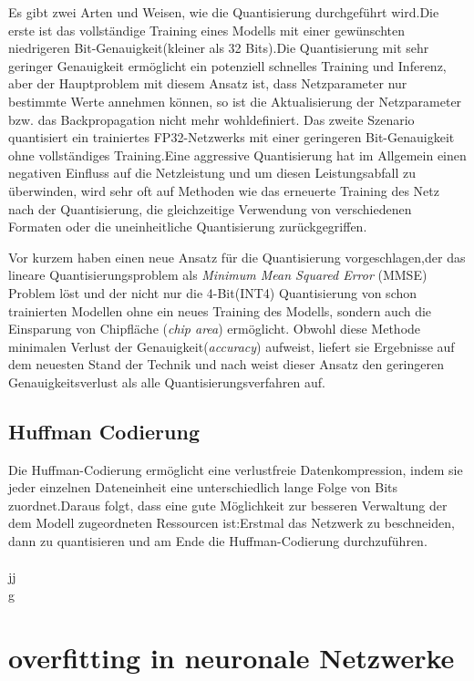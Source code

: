 \documentclass[12pt,a4paper]{scrartcl}
\numberwithin{equation}{section}
\begin{document}
Es gibt zwei Arten und Weisen, wie die Quantisierung durchgeführt wird.Die erste ist das vollständige Training eines Modells mit einer gewünschten niedrigeren Bit-Genauigkeit(kleiner als 32 Bits).Die Quantisierung mit sehr geringer Genauigkeit ermöglicht ein potenziell schnelles Training und Inferenz, aber der Hauptproblem mit diesem Ansatz ist, dass Netzparameter nur bestimmte Werte annehmen können, so ist die Aktualisierung der Netzparameter bzw. das Backpropagation nicht mehr wohldefiniert.
Das zweite Szenario  quantisiert ein trainiertes FP32-Netzwerks mit einer geringeren Bit-Genauigkeit ohne vollständiges Training.Eine aggressive Quantisierung hat im Allgemein einen negativen Einfluss auf die Netzleistung und um diesen Leistungsabfall zu überwinden, wird sehr oft auf Methoden wie das erneuerte Training des Netz nach der Quantisierung, die gleichzeitige Verwendung von verschiedenen Formaten oder die uneinheitliche Quantisierung zurückgegriffen.

Vor kurzem haben \cite[Yoni et al]{quantizationYoni} einen neue Ansatz für die Quantisierung vorgeschlagen,der das lineare Quantisierungsproblem als \textit{Minimum Mean Squared Error} (MMSE) Problem löst und der nicht nur die 4-Bit(INT4) Quantisierung von schon trainierten Modellen ohne ein neues Training des Modells, sondern auch die Einsparung von Chipfläche (\textit{chip area}) ermöglicht. Obwohl diese Methode  minimalen Verlust der Genauigkeit(\textit{accuracy}) aufweist, liefert sie Ergebnisse auf dem neuesten Stand der Technik und nach \cite{quantizationYoni} weist dieser Ansatz den geringeren Genauigkeitsverlust als alle Quantisierungsverfahren auf.

\subsection{Huffman Codierung}
Die Huffman-Codierung ermöglicht eine verlustfreie Datenkompression, indem sie jeder einzelnen Dateneinheit  eine unterschiedlich lange Folge von Bits zuordnet.Daraus folgt, dass eine gute Möglichkeit zur besseren Verwaltung der dem Modell zugeordneten Ressourcen ist:Erstmal das Netzwerk zu beschneiden, dann zu quantisieren und am Ende die Huffman-Codierung durchzuführen. \\ \\ jj\\g\\

 \section{overfitting in neuronale Netzwerke}
\end{document}
